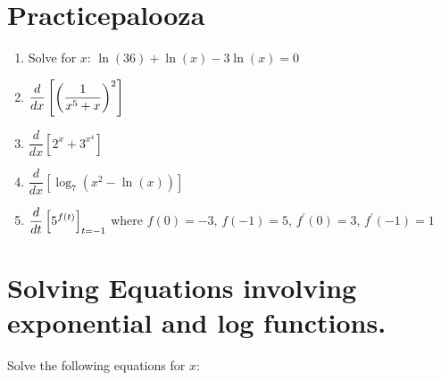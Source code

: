 \documentclass[10pt]{article}
\begin{document}
\section{Practicepalooza}
    \begin{enumerate}
    \item Solve for $x$: $\ln(36)+\ln(x)-3\ln(x)=0$
    \item $\displaystyle \dfrac{d}{dx}\left[ \left(\frac{1}{x^5 + x}\right)^2\right]$
    \item $\dfrac{d}{dx}[2^x + 3^{x^4}]$
    \item $\dfrac{d}{dx} \left [\log_7\left( x^2-\ln(x)\right)\right]$
    \item $\displaystyle \dfrac{d}{dt}\left[ 5^{f(t)}\right]_{t=-1}$ where $f(0)=-3$, $f(-1)=5$, $f^{\prime}(0)= 3$, $f^{\prime}(-1)= 1$ 
\end{enumerate}
\newpage
\section{Solving Equations involving exponential and log functions.}
Solve the following equations for $x$:
\newpage
\end{document}
